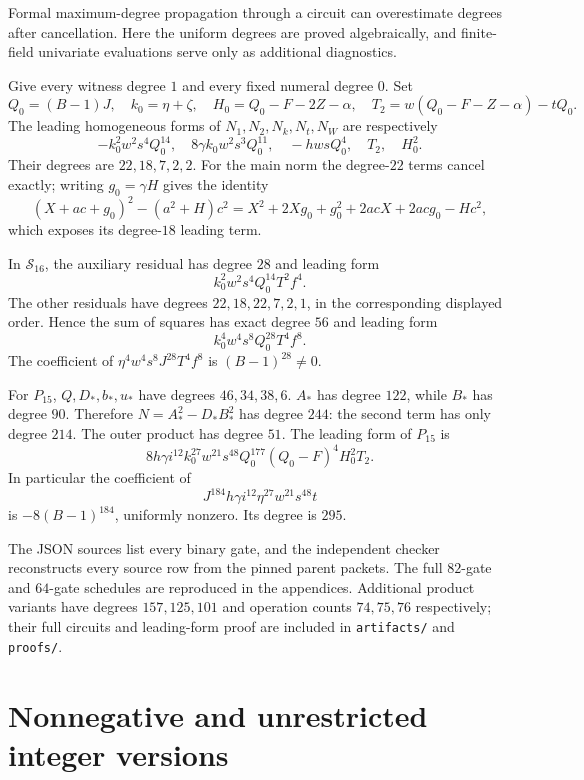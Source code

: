 \documentclass[11pt,a4paper]{article}
\theoremstyle{remark}
\newcommand{\code}[1]{\nolinkurl{#1}}
\newcommand{\nf}{N_1}
\newcommand{\nm}{N_2}
\newcommand{\nw}{N_W}
\newcommand{\nk}{N_k}
\newcommand{\nt}{N_t}
\begin{document}
Formal maximum-degree propagation through a circuit can overestimate
degrees after cancellation. Here the uniform degrees are proved
algebraically, and finite-field univariate evaluations serve only as
additional diagnostics.

Give every witness degree $1$ and every fixed numeral degree $0$. Set
\[
 Q_0=(B-1)J,\quad k_0=\eta+\zeta,\quad
 H_0=Q_0-F-2Z-\alpha,\quad
 T_2=w(Q_0-F-Z-\alpha)-tQ_0.
\]
The leading homogeneous forms of $\nf,\nm,\nk,\nt,\nw$ are
respectively
\[
 -k_0^2w^2s^4Q_0^{14},\quad
 8\gamma k_0w^2s^3Q_0^{11},\quad
 -hwsQ_0^4,\quad T_2,\quad H_0^2.
\]
Their degrees are $22,18,7,2,2$. For the main norm the degree-$22$
terms cancel exactly; writing $g_0=\gamma H$ gives the identity
\[
 (X+ac+g_0)^2-(a^2+H)c^2
 =X^2+2Xg_0+g_0^2+2acX+2acg_0-Hc^2,
\]
which exposes its degree-$18$ leading term.

In $\mathcal S_{16}$, the auxiliary residual has degree $28$ and leading
form
\[
 k_0^2w^2s^4Q_0^{14}T^2f^4.
\]
The other residuals have degrees $22,18,22,7,2,1$, in the corresponding
displayed order. Hence the sum of squares has exact degree $56$ and
leading form
\[
 k_0^4w^4s^8Q_0^{28}T^4f^8.
\]
The coefficient of $\eta^4w^4s^8J^{28}T^4f^8$ is
$(B-1)^{28}\ne0$.

For $P_{15}$, $Q,D_*,b_*,u_*$ have degrees $46,34,38,6$.
$A_*$ has degree $122$, while $B_*$ has degree $90$.
Therefore $N=A_*^2-D_*B_*^2$ has degree $244$: the second term has
only degree $214$. The outer product has degree $51$. The leading
form of $P_{15}$ is
\begin{equation}
 8h\gamma i^{12}k_0^{27}w^{21}s^{48}Q_0^{177}
 (Q_0-F)^4H_0^2T_2.
\label{eq:P15leader}
\end{equation}
In particular the coefficient of
\[
 J^{184}h\gamma i^{12}\eta^{27}w^{21}s^{48}t
\]
is $-8(B-1)^{184}$, uniformly nonzero. Its degree is $295$.

The JSON sources list every binary gate, and the independent checker
reconstructs every source row from the pinned parent packets. The full
$82$-gate and $64$-gate schedules are reproduced in the appendices.
Additional product variants have degrees $157,125,101$ and
operation counts $74,75,76$ respectively; their full circuits and
leading-form proof are included in \code{artifacts/} and \code{proofs/}.

\section{Nonnegative and unrestricted integer versions}
\label{sec:domains}
\end{document}

